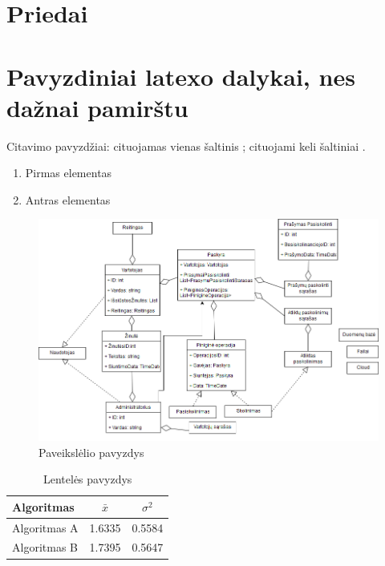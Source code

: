 \documentclass{VUMIFPSkursinis}
\begin{document}
\section{Priedai}

\newpage
\section{Pavyzdiniai latexo dalykai, nes dažnai pamirštu}
Citavimo pavyzdžiai: cituojamas vienas šaltinis \cite{PvzStraipsnLt}; cituojami
keli šaltiniai \cite{PvzStraipsnEn, PvzKonfLt, PvzKonfEn, PvzKnygLt, PvzKnygEn,
PvzElPubLt, PvzElPubEn, PvzMagistrLt, PvzPhdEn}.

\begin{enumerate}
	\item Pirmas elementas
	\item Antras elementas
\end{enumerate}

\begin{figure}[H]
    \centering
    \includegraphics[scale=0.5]{img/DomainModel}
    \caption{Paveikslėlio pavyzdys}
    \label{img:mlp}
\end{figure}

\begin{table}[H]\footnotesize
  \centering
  \caption{Lentelės pavyzdys}
  {\begin{tabular}{|l|c|c|} \hline
    Algoritmas & $\bar{x}$ & $\sigma^{2}$ \\
    \hline
    Algoritmas A  & 1.6335    & 0.5584       \\
    Algoritmas B  & 1.7395    & 0.5647       \\
    \hline
  \end{tabular}}
  \label{tab:table example}
\end{table}
\end{document}
